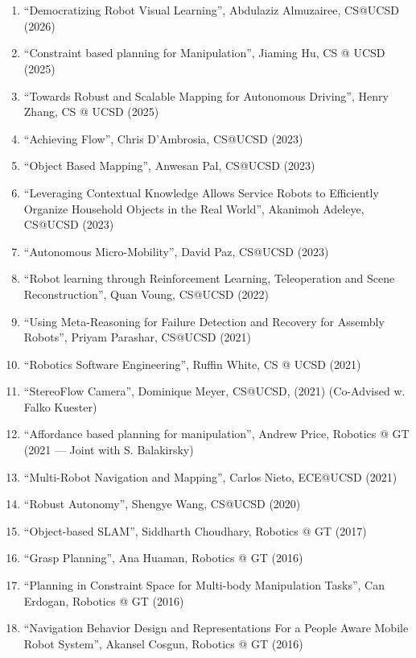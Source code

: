 \documentclass{article}
\begin{document}
\begin{cv}
\begin{cvlist}{~}
		\item[Ph.D supervision - Completed]\ \\
		\begin{enumerate}
			\item ``Democratizing Robot Visual Learning'', Abdulaziz Almuzairee, CS@UCSD (2026)
			\item ``Constraint based planning for Manipulation'', Jiaming Hu, CS @ UCSD (2025)
			\item ``Towards Robust and Scalable Mapping for Autonomous Driving'', Henry Zhang, CS @  UCSD (2025)
			\item ``Achieving Flow'', Chris D'Ambrosia, CS@UCSD (2023)
			\item ``Object Based Mapping'', Anwesan Pal, CS@UCSD (2023)
			\item ``Leveraging Contextual Knowledge Allows Service Robots to Efficiently
			      Organize Household Objects in the Real World'', Akanimoh Adeleye,
			      CS@UCSD (2023)
			\item ``Autonomous Micro-Mobility'', David Paz, CS@UCSD (2023)
			\item ``Robot learning through Reinforcement Learning, Teleoperation
			      and Scene Reconstruction'', Quan Voung, CS@UCSD (2022)
			\item ``Using Meta-Reasoning for Failure Detection and Recovery for
			      Assembly Robots'', Priyam Parashar, CS@UCSD (2021)
			\item ``Robotics Software Engineering'', Ruffin White, CS @ UCSD (2021)
			\item ``StereoFlow Camera'', Dominique Meyer, CS@UCSD, (2021)
			      (Co-Advised w. Falko Kuester)
			\item ``Affordance based planning for manipulation'', Andrew Price, Robotics
			      @ GT (2021 --- Joint with S. Balakirsky)
			\item ``Multi-Robot Navigation and Mapping'', Carlos Nieto, ECE@UCSD (2021)
			\item ``Robust Autonomy'', Shengye Wang, CS@UCSD (2020)
			\item ``Object-based SLAM'', Siddharth Choudhary, Robotics @ GT (2017)
			\item ``Grasp Planning'', Ana Huaman, Robotics @ GT (2016)
			\item ``Planning in Constraint Space for Multi-body Manipulation Tasks'',
			      Can Erdogan, Robotics @ GT (2016)
			\item ``Navigation Behavior Design and Representations For a People Aware
			      Mobile Robot System'', Akansel Cosgun, Robotics @ GT (2016)

\end{enumerate}
\end{cvlist}
\end{cv}
\end{document}
